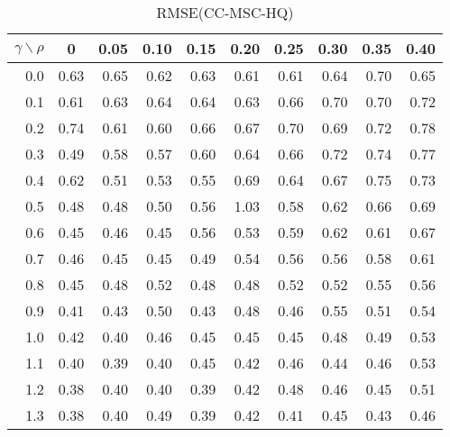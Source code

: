 \documentclass[12pt]{article}
\begin{document}
\begin{table}[!tbp]
\caption{RMSE(CC-MSC-HQ)}
 \begin{center}
 \begin{tabular}{r|rrrrrrrrr}\hline\hline
\multicolumn{1}{c|}{$\gamma\backslash\rho$}&\multicolumn{1}{c}{0}&\multicolumn{1}{c}{0.05}&\multicolumn{1}{c}{0.10}&\multicolumn{1}{c}{0.15}&\multicolumn{1}{c}{0.20}&\multicolumn{1}{c}{0.25}&\multicolumn{1}{c}{0.30}&\multicolumn{1}{c}{0.35}&\multicolumn{1}{c}{0.40}\tabularnewline
\hline


0.0&0.63&0.65&0.62&0.63&0.61&0.61&0.64&0.70&0.65\tabularnewline
0.1&0.61&0.63&0.64&0.64&0.63&0.66&0.70&0.70&0.72\tabularnewline
0.2&0.74&0.61&0.60&0.66&0.67&0.70&0.69&0.72&0.78\tabularnewline
0.3&0.49&0.58&0.57&0.60&0.64&0.66&0.72&0.74&0.77\tabularnewline
0.4&0.62&0.51&0.53&0.55&0.69&0.64&0.67&0.75&0.73\tabularnewline
0.5&0.48&0.48&0.50&0.56&1.03&0.58&0.62&0.66&0.69\tabularnewline
0.6&0.45&0.46&0.45&0.56&0.53&0.59&0.62&0.61&0.67\tabularnewline
0.7&0.46&0.45&0.45&0.49&0.54&0.56&0.56&0.58&0.61\tabularnewline
0.8&0.45&0.48&0.52&0.48&0.48&0.52&0.52&0.55&0.56\tabularnewline
0.9&0.41&0.43&0.50&0.43&0.48&0.46&0.55&0.51&0.54\tabularnewline
1.0&0.42&0.40&0.46&0.45&0.45&0.45&0.48&0.49&0.53\tabularnewline
1.1&0.40&0.39&0.40&0.45&0.42&0.46&0.44&0.46&0.53\tabularnewline
1.2&0.38&0.40&0.40&0.39&0.42&0.48&0.46&0.45&0.51\tabularnewline
1.3&0.38&0.40&0.49&0.39&0.42&0.41&0.45&0.43&0.46\tabularnewline
\hline
\end{tabular}

\end{center}

\end{table}
\end{document}

